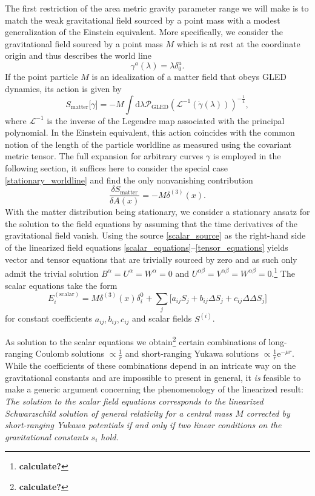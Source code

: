 The first restriction of the area metric gravity parameter range we will make is to match the weak gravitational field sourced by a point mass with a modest generalization of the Einstein equivalent. More specifically, we consider the gravitational field sourced by a point mass $M$ which is at rest at the coordinate origin and thus describes the world line
\begin{equation}\label{stationary_worldline}
  \gamma^a(\lambda) = \lambda \delta^a_0.
\end{equation}
If the point particle $M$ is an idealization of a matter field that obeys GLED dynamics, its action is given by \cite{R_tzel_2011,Rivera_2012}
\begin{equation}
  S_\text{matter}\lbrack\gamma\rbrack = -M \int \mathrm d\lambda \mathcal P_\text{GLED}(\mathcal L^{-1}(\dot\gamma(\lambda)))^{-\frac{1}{4}},
\end{equation}
where $\mathcal L^{-1}$ is the inverse of the Legendre map associated with the principal polynomial. In the Einstein equivalent, this action coincides with the common notion of the length of the particle worldline as measured using the covariant metric tensor. The full expansion for arbitrary curves $\gamma$ is employed in the following section, it suffices here to consider the special case \eqref{stationary_worldline} and find the only nonvanishing contribution
\begin{equation}\label{scalar_source}
  \frac{\delta S_\text{matter}}{\delta A(x)} = -M\delta^{(3)}(x).
\end{equation}
With the matter distribution being stationary, we consider a stationary ansatz for the solution to the field equations by assuming that the time derivatives of the gravitational field vanish. Using the source \eqref{scalar_source} as the right-hand side of the linearized field equations \eqref{scalar_equations}--\eqref{tensor_equations} yields vector and tensor equations that are trivially sourced by zero and as such only admit the trivial solution $B^\alpha = U^\alpha = W^\alpha = 0$ and $U^{\alpha\beta} = V^{\alpha\beta} = W^{\alpha\beta} = 0$.\footnote{\textbf{calculate?}} The scalar equations take the form
\begin{equation}
  E_i^{(\text{scalar})} = M \delta^{(3)}(x) \delta^0_i + \sum_j\lbrack a_{ij} S_j + b_{ij} \Delta S_j + c_{ij} \Delta\Delta S_j\rbrack
\end{equation}
for constant coefficients $a_{ij}, b_{ij}, c_{ij}$ and scalar fields $S^{(i)}$.

As solution to the scalar equations we obtain\footnote{\textbf{calculate?}} certain combinations of long-ranging Coulomb solutions $\propto \frac{1}{r}$ and short-ranging Yukawa solutions $\propto \frac{1}{r} \mathrm e^{-\mu r}$. While the coefficients of these combinations depend in an intricate way on the gravitational constants and are impossible to present in general, it \emph{is} feasible to make a generic argument concerning the phenomenology of the linearized result: \emph{The solution to the scalar field equations corresponds to the linearized Schwarzschild solution of general relativity for a central mass $M$ corrected by short-ranging Yukawa potentials if and only if two linear conditions on the gravitational constants $s_i$ hold.}

